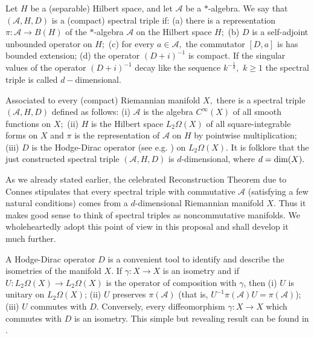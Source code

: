 \documentclass[12pt]{article}
\begin{document}
Let $H$ be a (separable) Hilbert space, and let $\mathcal{A}$ be a $\ast$-algebra. We say that $(\mathcal{A},H,D)$ is a (compact) spectral triple if: (a) there is a representation $\pi:\mathcal{A}\to B(H)$ of the $\ast$-algebra $\mathcal{A}$ on the Hilbert space $H;$ (b) $D$ is a self-adjoint unbounded operator on $H;$ (c) for every $a\in\mathcal{A},$ the commutator $[D,a]$ is has bounded extension; (d) the operator $(D+i)^{-1}$ is compact. If the singular values of the operator $(D+i)^{-1}$ decay like the sequence $k^{-\frac1d},$ $k\geq 1$ the spectral triple is called $d-$dimensional.

Associated to every (compact) Riemannian manifold $X,$ there is a spectral triple $(\mathcal{A},H,D)$ defined as follows: (i) $\mathcal{A}$ is the algebra $C^{\infty}(X)$ of all smooth functions on $X;$ (ii) $H$ is the Hilbert space $L_2\Omega(X)$ of all square-integrable forms on $X$ and $\pi$ is the representation of $\mathcal{A}$ on $H$ by pointwise multiplication; (iii) $D$ is the Hodge-Dirac operator (see e.g. \cite{BGV}) on $L_2\Omega(X).$ It is folklore that the just constructed spectral triple $(\mathcal{A},H,D)$ is $d$-dimensional, where $d={\rm dim}(X).$ 


As we already stated earlier, the celebrated Reconstruction Theorem due to Connes \cite{Connes-reconstruction} stipulates that every spectral triple with commutative $\mathcal{A}$ (satisfying a few natural conditions) comes from a $d$-dimensional Riemannian manifold $X.$ Thus it makes good sense to think of spectral triples as noncommutative manifolds. We wholeheartedly adopt this point of view in this proposal and shall develop it much further.

A Hodge-Dirac operator $D$ is a convenient tool to identify and describe the isometries of the manifold $X.$ If $\gamma:X\to X$ is an isometry and if $U:L_2\Omega(X)\to L_2\Omega(X)$ is the  operator of composition with $\gamma$, then (i) $U$ is unitary on $L_2\Omega(X)$; (ii) $U$ preserves $\pi(\mathcal{A})$ (that is, $U^{-1}\pi(\mathcal{A})U=\pi(\mathcal{A})$); (iii) $U$ commutes with $D.$ Conversely, every diffeomorphism $\gamma:X\to X$ which commutes with $D$ is an isometry. This simple but revealing result can be found in \cite{helgason}.
\end{document}
